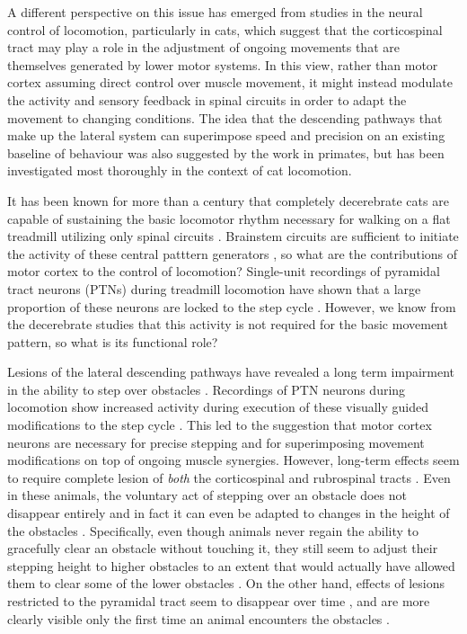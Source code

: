 A different perspective on this issue has emerged from studies in the neural control of locomotion, particularly in cats, which suggest that the corticospinal tract may play a role in the adjustment of ongoing movements that are themselves generated by lower motor systems. In this view, rather than motor cortex assuming direct control over muscle movement, it might instead modulate the activity and sensory feedback in spinal circuits in order to adapt the movement to changing conditions. The idea that the descending pathways that make up the lateral system can superimpose speed and precision on an existing baseline of behaviour was also suggested by the work in primates, but has been investigated most thoroughly in the context of cat locomotion.

It has been known for more than a century that completely decerebrate cats are capable of sustaining the basic locomotor rhythm necessary for walking on a flat treadmill utilizing only spinal circuits \cite{GrahamBrown1911}. Brainstem circuits are sufficient to initiate the activity of these central patttern generators \cite{Grillner1973}, so what are the contributions of motor cortex to the control of locomotion? Single-unit recordings of pyramidal tract neurons (PTNs) during treadmill locomotion have shown that a large proportion of these neurons are locked to the step cycle \cite{Armstrong1984a}. However, we know from the decerebrate studies that this activity is not required for the basic movement pattern, so what is its functional role?

Lesions of the lateral descending pathways have revealed a long term impairment in the ability to step over obstacles \cite{Drew2002}. Recordings of PTN neurons during locomotion show increased activity during execution of these visually guided modifications to the step cycle \cite{Drew1996}. This led to the suggestion that motor cortex neurons are necessary for precise stepping and for superimposing movement modifications on top of ongoing muscle synergies. However, long-term effects seem to require complete lesion of \emph{both} the corticospinal and rubrospinal tracts \cite{Drew2002}. Even in these animals, the voluntary act of stepping over an obstacle does not disappear entirely and in fact it can even be adapted to changes in the height of the obstacles \cite{Drew2002}. Specifically, even though animals never regain the ability to gracefully clear an obstacle without touching it, they still seem to adjust their stepping height to higher obstacles to an extent that would actually have allowed them to clear some of the lower obstacles \cite{Drew2002}. On the other hand, effects of lesions restricted to the pyramidal tract seem to disappear over time \cite{Liddell1944}, and are more clearly visible only the first time an animal encounters the obstacles \cite{Liddell1944}.

